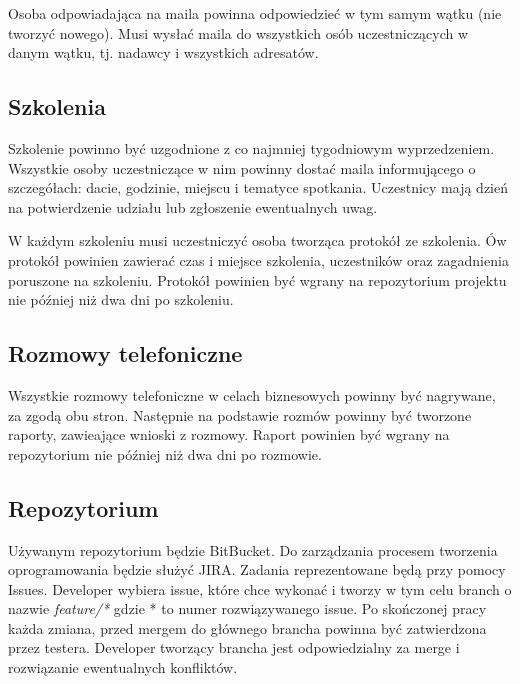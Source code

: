 \documentclass{article}
\begin{document}
Osoba odpowiadająca na maila powinna odpowiedzieć w tym samym wątku (nie tworzyć nowego). Musi wysłać maila do wszystkich osób uczestniczących w danym wątku, tj. nadawcy i wszystkich adresatów.

\subsection{Szkolenia}
Szkolenie powinno być uzgodnione z co najmniej tygodniowym wyprzedzeniem. Wszystkie osoby uczestniczące w nim powinny dostać maila informującego o szczegółach: dacie, godzinie, miejscu i tematyce spotkania. Uczestnicy mają dzień na potwierdzenie udziału lub zgłoszenie ewentualnych uwag.

W każdym szkoleniu musi uczestniczyć osoba tworząca protokół ze szkolenia. Ów protokół powinien zawierać czas i miejsce szkolenia, uczestników oraz zagadnienia poruszone na szkoleniu. Protokół powinien być wgrany na repozytorium projektu nie później niż dwa dni po szkoleniu.

\subsection{Rozmowy telefoniczne}
Wszystkie rozmowy telefoniczne w celach biznesowych powinny być nagrywane, za zgodą obu stron. Następnie na podstawie rozmów powinny być tworzone raporty, zawieające wnioski z rozmowy. Raport powinien być wgrany na repozytorium nie później niż dwa dni po rozmowie.

\subsection{Repozytorium}
Używanym repozytorium będzie BitBucket. Do zarządzania procesem tworzenia oprogramowania będzie służyć JIRA. Zadania reprezentowane będą przy pomocy Issues. Developer wybiera issue, które chce wykonać i tworzy w tym celu branch o nazwie \textit{feature/*} gdzie * to numer rozwiązywanego issue. Po skończonej pracy każda zmiana, przed mergem do głównego brancha powinna być zatwierdzona przez testera. Developer tworzący brancha jest odpowiedzialny za merge i rozwiązanie ewentualnych konfliktów.

\newpage
\end{document}
